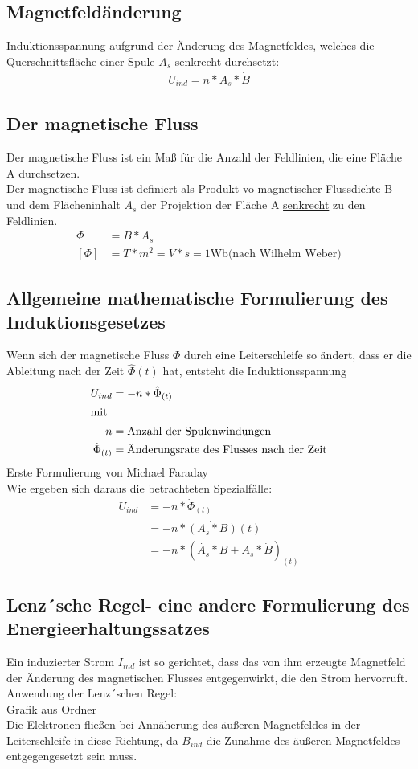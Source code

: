 \documentclass[12 pt]{article}
\numberwithin{equation}{section}
\begin{document}
	\subsection{Magnetfeldänderung}
	Induktionsspannung aufgrund der Änderung des Magnetfeldes, welches die Querschnittsfläche einer Spule $A_s$ senkrecht durchsetzt:
	\begin{align}
		U_{ind}=n*A_s*\dot{B}
	\end{align}
	\subsection{Der magnetische Fluss}
	Der magnetische Fluss ist ein Maß für die Anzahl der Feldlinien, die eine Fläche A durchsetzen.\\
	Der magnetische Fluss ist definiert als Produkt vo magnetischer Flussdichte B und dem Flächeninhalt $A_s$ der Projektion der Fläche A \underline{senkrecht} zu den Feldlinien.
	\begin{align}
	\Phi&=B*A_s\\
	[\Phi]&=T*m^2=V*s=1\text{Wb(nach Wilhelm Weber)}\nonumber
	\end{align}
	\subsection{Allgemeine mathematische Formulierung des Induktionsgesetzes}
	Wenn sich der magnetische Fluss $\Phi$ durch eine Leiterschleife so ändert, dass er die Ableitung nach der Zeit $\hat{\Phi}(t)$ hat, entsteht die Induktionsspannung
	\begin{align}
	U_{ind}&=-n*\hat{\Phi}_{(t)}\\
	\intertext{mit}
	-n&=\text{Anzahl der Spulenwindungen}\nonumber\\
	\dot{\Phi}_{(t)}&=\text{Änderungsrate des Flusses nach der Zeit}\nonumber
	\end{align}
	Erste Formulierung von Michael Faraday\\
	Wie ergeben sich daraus die betrachteten Spezialfälle:
	\begin{align*}
	U_{ind}&=-n*\dot{\Phi}_{(t)}\\
	&=-n*\dot{(A_s*B)}(t)\\
	&=-n*(\dot{A_s}*B+A_s*\dot{B})_{(t)}
	\end{align*}
	\subsection{Lenz´sche Regel- eine andere Formulierung des Energieerhaltungssatzes}
	Ein induzierter Strom $I_{ind}$ ist so gerichtet, dass das von ihm erzeugte Magnetfeld der Änderung des magnetischen Flusses entgegenwirkt, die den Strom hervorruft.\\
	Anwendung der Lenz´schen Regel:\\
	Grafik aus Ordner\\
	Die Elektronen fließen bei Annäherung des äußeren Magnetfeldes in der Leiterschleife in diese Richtung, da $B_{ind}$ die Zunahme des äußeren Magnetfeldes entgegengesetzt sein muss.
\end{document}

